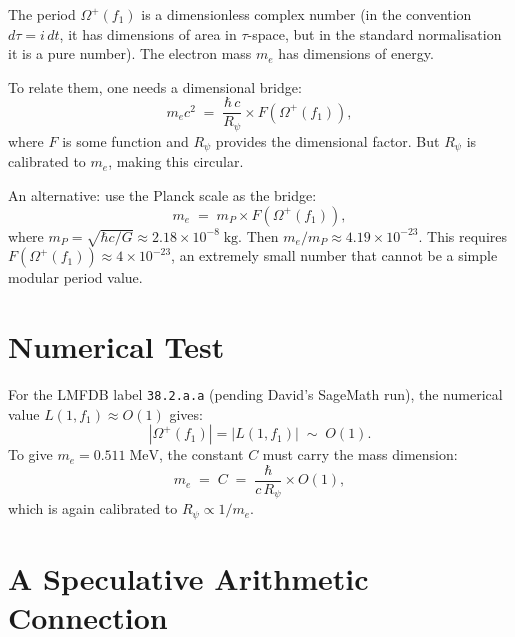 \documentclass[12pt,a4paper]{article}
\theoremstyle{definition}
\theoremstyle{remark}
\begin{document}
The period $\Omega^+(f_1)$ is a dimensionless complex number (in the
convention $d\tau = i\,dt$, it has dimensions of area in $\tau$-space,
but in the standard normalisation it is a pure number).  The electron
mass $m_e$ has dimensions of energy.

To relate them, one needs a dimensional bridge:
\begin{equation}
  m_e c^2 \;=\; \frac{\hbar\,c}{R_\psi} \times F(\Omega^+(f_1)),
\end{equation}
where $F$ is some function and $R_\psi$ provides the dimensional factor.
But $R_\psi$ is calibrated to $m_e$, making this circular.

An alternative: use the Planck scale as the bridge:
\begin{equation}
  m_e \;=\; m_P \times F(\Omega^+(f_1)),
\end{equation}
where $m_P = \sqrt{\hbar c/G} \approx 2.18 \times 10^{-8}\;\mathrm{kg}$.
Then $m_e/m_P \approx 4.19 \times 10^{-23}$.  This requires
$F(\Omega^+(f_1)) \approx 4 \times 10^{-23}$, an extremely small number
that cannot be a simple modular period value.

\section{Numerical Test}
\label{sec:numerical}

For the LMFDB label \texttt{38.2.a.a} (pending David's SageMath run),
the numerical value $L(1,f_1) \approx O(1)$ gives:
\begin{equation}
  |\Omega^+(f_1)| = |L(1,f_1)| \;\sim\; O(1).
\end{equation}
To give $m_e = 0.511\;\mathrm{MeV}$, the constant $C$ must carry the
mass dimension:
\begin{equation}
  m_e \;=\; C \;=\; \frac{\hbar}{c\,R_\psi} \times O(1),
\end{equation}
which is again calibrated to $R_\psi \propto 1/m_e$.

\section{A Speculative Arithmetic Connection}
\label{sec:speculative}
\end{document}
